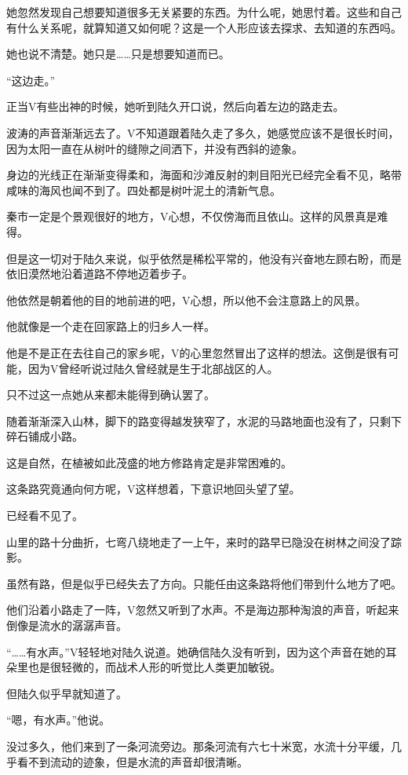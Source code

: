 她忽然发现自己想要知道很多无关紧要的东西。为什么呢，她思忖着。这些和自己有什么关系呢，就算知道又如何呢？这是一个人形应该去探求、去知道的东西吗。

她也说不清楚。她只是……只是想要知道而已。

“这边走。”

正当V有些出神的时候，她听到陆久开口说，然后向着左边的路走去。

波涛的声音渐渐远去了。V不知道跟着陆久走了多久，她感觉应该不是很长时间，因为太阳一直在从树叶的缝隙之间洒下，并没有西斜的迹象。

身边的光线正在渐渐变得柔和，海面和沙滩反射的刺目阳光已经完全看不见，略带咸味的海风也闻不到了。四处都是树叶泥土的清新气息。

秦市一定是个景观很好的地方，V心想，不仅傍海而且依山。这样的风景真是难得。

但是这一切对于陆久来说，似乎依然是稀松平常的，他没有兴奋地左顾右盼，而是依旧漠然地沿着道路不停地迈着步子。

他依然是朝着他的目的地前进的吧，V心想，所以他不会注意路上的风景。

他就像是一个走在回家路上的归乡人一样。

他是不是正在去往自己的家乡呢，V的心里忽然冒出了这样的想法。这倒是很有可能，因为V曾经听说过陆久曾经就是生于北部战区的人。

只不过这一点她从来都未能得到确认罢了。

随着渐渐深入山林，脚下的路变得越发狭窄了，水泥的马路地面也没有了，只剩下碎石铺成小路。

这是自然，在植被如此茂盛的地方修路肯定是非常困难的。

这条路究竟通向何方呢，V这样想着，下意识地回头望了望。

已经看不见了。

山里的路十分曲折，七弯八绕地走了一上午，来时的路早已隐没在树林之间没了踪影。

虽然有路，但是似乎已经失去了方向。只能任由这条路将他们带到什么地方了吧。

他们沿着小路走了一阵，V忽然又听到了水声。不是海边那种淘浪的声音，听起来倒像是流水的潺潺声音。

“……有水声。”V轻轻地对陆久说道。她确信陆久没有听到，因为这个声音在她的耳朵里也是很轻微的，而战术人形的听觉比人类更加敏锐。

但陆久似乎早就知道了。

“嗯，有水声。”他说。

没过多久，他们来到了一条河流旁边。那条河流有六七十米宽，水流十分平缓，几乎看不到流动的迹象，但是水流的声音却很清晰。

